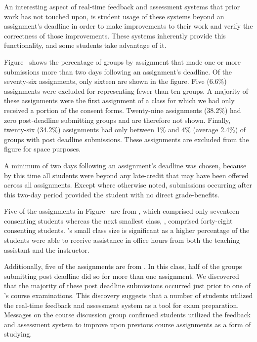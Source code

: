 An interesting aspect of real-time feedback and assessment systems that prior
work has not touched upon, is student usage of these systems beyond an
assignment's deadline in order to make improvements to their work and verify
the correctness of those improvements. These systems inherently provide this
functionality, and some students take advantage of it.

Figure~ shows the percentage of groups by assignment that
made one or more submissions more than two days following an assignment's
deadline. Of the seventy-six assignments, only sixteen are shown in the
figure. Five (6.6\%) assignments were excluded for representing fewer than ten
groups. A majority of these assignments were the first assignment of a class
for which we had only received a portion of the consent forms. Twenty-nine
assignments (38.2\%) had zero post-deadline submitting groups and are therefore
not shown. Finally, twenty-six (34.2\%) assignments had only between 1\% and
4\% (average 2.4\%) of groups with post deadline submissions. These assignments
are excluded from the figure for space purposes.

A minimum of two days following an assignment's deadline was chosen, because by
this time all students were beyond any late-credit that may have been offered
across all assignments. Except where otherwise noted, submissions occurring
after this two-day period provided the student with no direct grade-benefits.

Five of the assignments in Figure~ are from ,
which comprised only seventeen consenting students whereas the next smallest
class, , comprised forty-eight consenting students. 's
small class size is significant as a higher percentage of the students were
able to receive assistance in office hours from both the teaching assistant and
the instructor.

Additionally, five of the assignments are from . In this class, half
of the groups submitting post deadline did so for more than one assignment. We
discovered that the majority of these post deadline submissions occurred just
prior to one of 's course examinations. This discovery suggests that
a number of students utilized the real-time feedback and assessment system as a
tool for exam preparation. Messages on the course discussion group confirmed
students utilized the feedback and assessment system to improve upon previous
course assignments as a form of studying.

